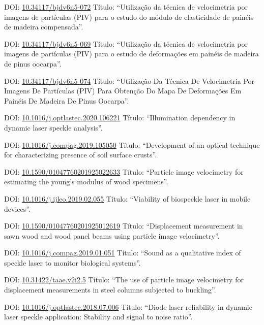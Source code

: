 \documentclass[11pt,a4paper,sans]{moderncv} %
\newcommand{\doiurl}[1]{\href{https://doi.org/#1}{#1}}
\begin{document}
	      {DOI: \doiurl{10.34117/bjdv6n5-072}}{}{}
	      {Título: ``Utilização da técnica de velocimetria por imagens de partículas (PIV) para o estudo do módulo de elasticidade de painéis de madeira compensada''.}

	      {DOI: \doiurl{10.34117/bjdv6n5-069}}{}{}
	      {Título: ``Utilização da técnica de velocimetria por imagens de partículas (PIV) para o estudo de deformações em painéis de madeira de pinus oocarpa''.}


	      {DOI: \doiurl{10.34117/bjdv6n5-074}}{}{}
	      {Título: ``Utilização Da Técnica De Velocimetria Por Imagens De Partículas (PIV) Para Obtenção Do Mapa De Deformações Em Painéis De Madeira De Pinus Oocarpa''.}

	      {DOI: \doiurl{10.1016/j.optlastec.2020.106221}}{}{}
	      {Título: ``Illumination dependency in dynamic laser speckle analysis''.}


	      {DOI: \doiurl{10.1016/j.compag.2019.105050}}{}{}
	      {Título: ``Development of an optical technique for characterizing presence of soil surface crusts''.}


	      {DOI: \doiurl{10.1590/01047760201925022633}}{}{}
	      {Título: ``Particle image velocimetry for estimating the young’s modulus of wood specimens''.}

	      {DOI: \doiurl{10.1016/j.ijleo.2019.02.055}}{}{}
	      {Título: ``Viability of biospeckle laser in mobile devices''.}

	      {DOI: \doiurl{10.1590/01047760201925012619}}{}{}
	      {Título: ``Displacement measurement in sawn wood and wood panel beams using particle image velocimetry''.}

	      {DOI: \doiurl{10.1016/j.compag.2019.01.051}}{}{}
	      {Título: ``Sound as a qualitative index of speckle laser to monitor biological systems''.}

	      {DOI: \doiurl{10.31422/taae.v2i2.5}}{}{}
	      {Título: ``The use of particle image velocimetry for displacement measurements in steel columns subjected to buckling''.}
	      
	      {DOI: \doiurl{10.1016/j.optlastec.2018.07.006}}{}{}
	      {Título: ``Diode laser reliability in dynamic laser speckle application: Stability and signal to noise ratio''.}
	      
\end{document}
